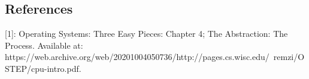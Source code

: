 \documentclass[main]{subfiles}
\begin{document}
\subsection{References}
[1]: Operating Systems: Three Easy Pieces: Chapter 4; The Abstraction: The Process. Available at: https://web.archive.org/web/20201004050736/http://pages.cs.wisc.edu/~remzi/OSTEP/cpu-intro.pdf.

\end{document}

